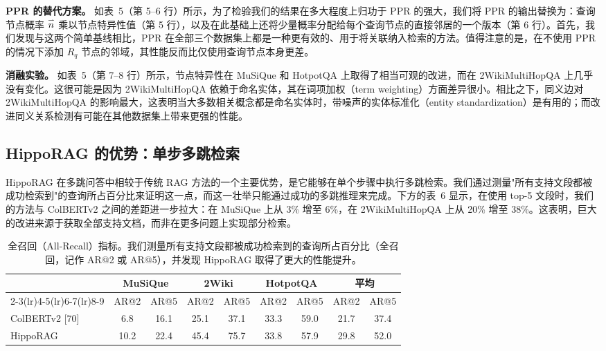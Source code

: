 \documentclass[11pt,UTF8,fontset=fandol]{ctexart}
\newcommand{\vecn}{\overset{\text{\tiny$\rightharpoonup$}}{n}}
\begin{document}
\textbf{PPR 的替代方案。} 如表~5（第 5--6 行）所示，为了检验我们的结果在多大程度上归功于 PPR 的强大，我们将 PPR 的输出替换为：查询节点概率 $\vecn$ 乘以节点特异性值（第 5 行），以及在此基础上还将少量概率分配给每个查询节点的直接邻居的一个版本（第 6 行）。首先，我们发现与这两个简单基线相比，PPR 在全部三个数据集上都是一种更有效的、用于将关联纳入检索的方法。值得注意的是，在不使用 PPR 的情况下添加 $R_q$ 节点的邻域，其性能反而比仅使用查询节点本身更差。

\textbf{消融实验。} 如表~5（第 7--8 行）所示，节点特异性在 MuSiQue 和 HotpotQA 上取得了相当可观的改进，而在 2WikiMultiHopQA 上几乎没有变化。这很可能是因为 2WikiMultiHopQA 依赖于命名实体，其在词项加权（term weighting）方面差异很小。相比之下，同义边对 2WikiMultiHopQA 的影响最大，这表明当大多数相关概念都是命名实体时，带噪声的实体标准化（entity standardization）是有用的；而改进同义关系检测有可能在其他数据集上带来更强的性能。

\subsection{HippoRAG 的优势：单步多跳检索}

HippoRAG 在多跳问答中相较于传统 RAG 方法的一个主要优势，是它能够在单个步骤中执行多跳检索。我们通过测量"所有支持文段都被成功检索到"的查询所占百分比来证明这一点，而这一壮举只能通过成功的多跳推理来完成。下方的表~6 显示，在使用 top-5 文段时，我们的方法与 ColBERTv2 之间的差距进一步拉大：在 MuSiQue 上从 3\% 增至 6\%，在 2WikiMultiHopQA 上从 20\% 增至 38\%。这表明，巨大的改进来源于获取全部支持文档，而非在更多问题上实现部分检索。

\begin{table}[H]\centering
\caption{全召回（All-Recall）指标。我们测量所有支持文段都被成功检索到的查询所占百分比（全召回，记作 AR@2 或 AR@5），并发现 HippoRAG 取得了更大的性能提升。}
\label{tab:6}
\begin{tabular}{lcccccccc}
\toprule
 & \multicolumn{2}{c}{MuSiQue} & \multicolumn{2}{c}{2Wiki} & \multicolumn{2}{c}{HotpotQA} & \multicolumn{2}{c}{平均} \\
\cmidrule(lr){2-3}\cmidrule(lr){4-5}\cmidrule(lr){6-7}\cmidrule(lr){8-9}
 & AR@2 & AR@5 & AR@2 & AR@5 & AR@2 & AR@5 & AR@2 & AR@5 \\
\midrule
ColBERTv2 [70] & 6.8 & 16.1 & 25.1 & 37.1 & 33.3 & 59.0 & 21.7 & 37.4 \\
HippoRAG & 10.2 & 22.4 & 45.4 & 75.7 & 33.8 & 57.9 & 29.8 & 52.0 \\
\bottomrule
\end{tabular}
\end{table}
\end{document}
